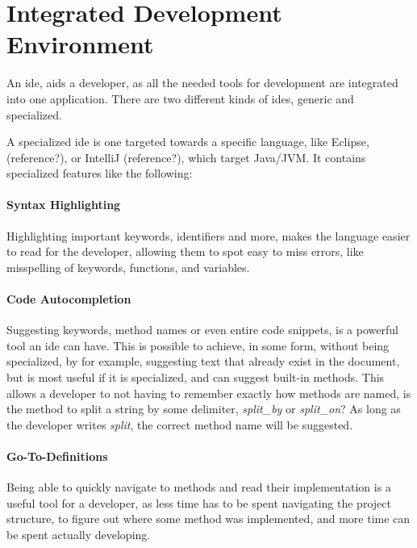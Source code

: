 \section{Integrated Development Environment} \label{sec:ide}

An \gls{ide}, aids a developer, as all the needed tools for development are
integrated into one application. There are two different kinds of \gls{ide}s,
generic and specialized. 

A specialized \gls{ide} is one targeted towards a specific language, like
Eclipse, (reference?), or IntelliJ (reference?), which target Java/JVM. It
contains specialized features like the following:

\paragraph{Syntax Highlighting} Highlighting important keywords, identifiers
and more, makes the language easier to read for the developer, allowing them to
spot easy to miss errors, like misspelling of keywords, functions, and
variables.

\paragraph{Code Autocompletion} Suggesting keywords, method names or even entire
code snippets, is a powerful tool an \gls{ide} can have. This is possible to
achieve, in some form, without being specialized, by for example, suggesting
text that already exist in the document, but is most useful if it is
specialized, and can suggest built-in methods. This allows a developer to not
having to remember exactly how methods are named, is the method to split a
string by some delimiter, \textit{split\_by} or \textit{split\_on}? As long as
the developer writes \textit{split}, the correct method name will be suggested.

\paragraph{Go-To-Definitions} Being able to quickly navigate to methods and read
their implementation is a useful tool for a developer, as less time has to be
spent navigating the project structure, to figure out where some method was
implemented, and more time can be spent actually developing.

